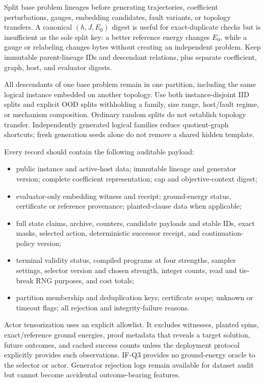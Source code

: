 Split base problem lineages before generating trajectories, coefficient perturbations, gauges, embedding candidates, fault variants, or topology transfers. A canonical $(h,J,E_0)$ digest is useful for exact-duplicate checks but is insufficient as the sole split key: a better reference energy changes $E_0$, while a gauge or relabeling changes bytes without creating an independent problem. Keep immutable parent-lineage IDs and descendant relations, plus separate coefficient, graph, host, and evaluator digests.

All descendants of one base problem remain in one partition, including the same logical instance embedded on another topology. Use both instance-disjoint IID splits and explicit OOD splits withholding a family, size range, host/fault regime, or mechanism composition. Ordinary random splits do not establish topology transfer. Independently generated logical families reduce quotient-graph shortcuts; fresh generation seeds alone do not remove a shared hidden template.

Every record should contain the following auditable payload:
\begin{itemize}
 \item public instance and active-host data; immutable lineage and generator version; complete coefficient representation; cap and objective-context digest;
 \item evaluator-only embedding witness and receipt; ground-energy status, certificate or reference provenance; planted-clause data when applicable;
 \item full state claims, archive, counters, candidate payloads and stable IDs, exact masks, selected action, deterministic successor receipt, and continuation-policy version;
 \item terminal validity status, compiled programs at four strengths, sampler settings, selector version and chosen strength, integer counts, read and tie-break RNG purposes, and cost totals;
 \item partition membership and deduplication keys; certificate scope; unknown or timeout flags; all rejection and integrity-failure reasons.
\end{itemize}
Actor tensorization uses an explicit allowlist. It excludes witnesses, planted spins, exact/reference ground energies, proof metadata that reveals a target solution, future outcomes, and cached success counts unless the deployment protocol explicitly provides such observations. IF-Q3 provides no ground-energy oracle to the selector or actor. Generator rejection logs remain available for dataset audit but cannot become accidental outcome-bearing features.

